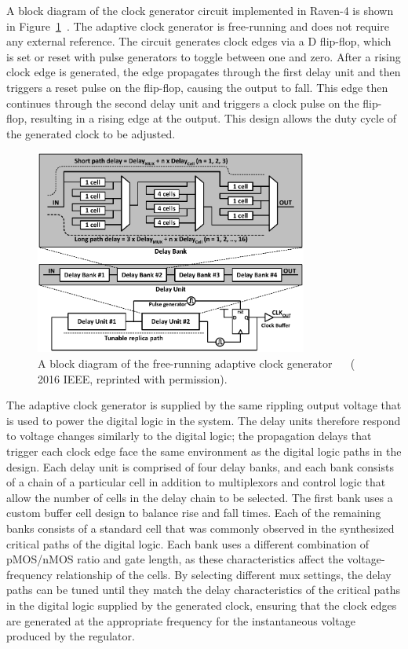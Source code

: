 \documentclass[graybox]{svmult}
\begin{document}
A block diagram of the clock generator circuit implemented in Raven-4 is shown in Figure~\ref{fig:3-clockgen}~\cite{Keller2017}.
The adaptive clock generator is free-running and does not require any external reference.
The circuit generates clock edges via a D flip-flop, which is set or reset with pulse generators to toggle between one and zero.
After a rising clock edge is generated, the edge propagates through the first delay unit and then triggers a reset pulse on the flip-flop, causing the output to fall.
This edge then continues through the second delay unit and triggers a clock pulse on the flip-flop, resulting in a rising edge at the output.
This design allows the duty cycle of the generated clock to be adjusted.

\begin{figure}
  \centering
  \includegraphics[width=0.8\textwidth]{3-clockgen}
  \caption{A block diagram of the free-running adaptive clock generator~\cite{Keller2017} ~\cite{Keller2016} ({\textcopyright} 2016 IEEE, reprinted with permission).}
  \label{fig:3-clockgen}
\end{figure}

The adaptive clock generator is supplied by the same rippling output voltage that is used to power the digital logic in the system.
The delay units therefore respond to voltage changes similarly to the digital logic; the propagation delays that trigger each clock edge face the same environment as the digital logic paths in the design.
Each delay unit is comprised of four delay banks, and each bank consists of a chain of a particular cell in addition to multiplexors and control logic that allow the number of cells in the delay chain to be selected.
The first bank uses a custom buffer cell design to balance rise and fall times.
Each of the remaining banks consists of a standard cell that was commonly observed in the synthesized critical paths of the digital logic.
Each bank uses a different combination of pMOS/nMOS ratio and gate length, as these characteristics affect the voltage-frequency relationship of the cells.
By selecting different mux settings, the delay paths can be tuned until they match the delay characteristics of the critical paths in the digital logic supplied by the generated clock, ensuring that the clock edges are generated at the appropriate frequency for the instantaneous voltage produced by the regulator.
\end{document}
